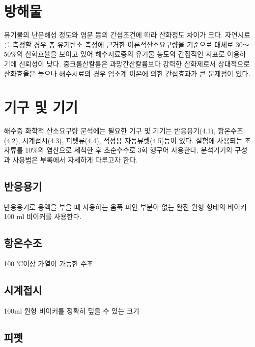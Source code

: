 \documentclass[
]{book}
\begin{document}
\hypertarget{uxbc29uxd574uxbb3c-1}{%
\section{방해물}\label{uxbc29uxd574uxbb3c-1}}

유기물의 난분해성 정도와 염분 등의 간섭조건에 따라 산화정도 차이가 크다. 자연시료를 측정할 경우 총 유기탄소 측정에 근거한 이론적산소요구량을 기준으로 대체로 30～50\%의 산화효율을 보이고 있어 해수시료중의 유기물 농도의 간접적인 지표로 이용하기에 신뢰성이 낮다. 중크롬산칼륨은 과망간산칼륨보다 강력한 산화제로서 상대적으로 산화효율은 높으나 해수시료의 경우 염소계 이온에 의한 간섭효과가 큰 문제점이 있다.

\hypertarget{uxae30uxad6c-uxbc0f-uxae30uxae30-1}{%
\section{기구 및 기기}\label{uxae30uxad6c-uxbc0f-uxae30uxae30-1}}

해수중 화학적 산소요구량 분석에는 필요한 기구 및 기기는 반응용기(4.1), 항온수조(4.2), 시계접시(4.3), 피펫류(4.4), 적정용 자동뷰렛(4.5)등이 있다. 실험에 사용되는 초자류를 10\%의 염산으로 세척한 후 초순수수로 3회 헹구어 사용한다. 분석기기의 구성과 사용법은 부록에서 자세하게 다루고자 한다.

\hypertarget{uxbc18uxc751uxc6a9uxae30}{%
\subsection{반응용기}\label{uxbc18uxc751uxc6a9uxae30}}

반응용기로 용액을 부을 때 사용하는 움푹 파인 부분이 없는 완전 원형 형태의 비이커100 ml 비이커를 사용한다.

\hypertarget{uxd56duxc628uxc218uxc870}{%
\subsection{항온수조}\label{uxd56duxc628uxc218uxc870}}

100 ℃이상 가열이 가능한 수조

\hypertarget{uxc2dcuxacc4uxc811uxc2dc}{%
\subsection{시계접시}\label{uxc2dcuxacc4uxc811uxc2dc}}

100ml 원형 비이커를 정확히 덮을 수 있는 크기

\hypertarget{uxd53cuxd3ab-1}{%
\subsection{피펫}\label{uxd53cuxd3ab-1}}
\end{document}
